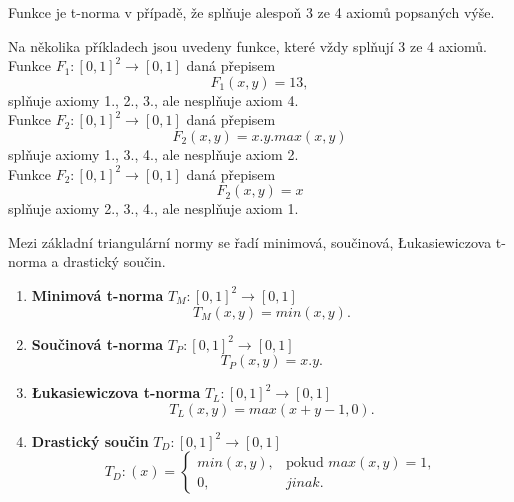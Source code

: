 \begin{remark}
    Funkce je t-norma v případě, že spl\v nuje alespo\v n 3 ze 4 axiom\r u popsaných výše.
\end{remark}

\begin{example} Na několika příkladech jsou uvedeny funkce, které vždy spl\v nují 3 ze 4 axiom\r u.\\
    Funkce $F_1 : [0, 1]^2 \rightarrow [0, 1]$ daná přepisem\\
    $$F_1(x,y) = 13,$$
    spl\v nuje axiomy 1., 2., 3., ale nespl\v nuje axiom 4.\\

    Funkce $F_2 : [0, 1]^2 \rightarrow [0, 1]$ daná přepisem\\
    $$F_2(x,y) = x.y.max(x,y)$$
    spl\v nuje axiomy 1., 3., 4., ale nespl\v nuje axiom 2.\\

    Funkce $F_2 : [0, 1]^2 \rightarrow [0, 1]$ daná přepisem\\
    $$F_2(x,y) = x$$
    spl\v nuje axiomy 2., 3., 4., ale nespl\v nuje axiom 1.\\
    
\end{example}

Mezi základní triangulární normy se řadí minimová, součinová, Łukasiewiczova t-norma a drastický součin.
\begin{example}
\cite{hlinena}
    \begin{enumerate}
    \item \textbf{Minimová t-norma} $T_M: [0,1]^2 \rightarrow [0,1]$
    $$T_M(x,y) = min(x,y).$$
    \item \textbf{Součinová t-norma} $T_P: [0,1]^2 \rightarrow [0,1]$
    $$T_P(x,y) = x.y.$$
    \item \textbf{Łukasiewiczova t-norma} $T_L: [0,1]^2 \rightarrow [0,1]$
    $$T_L(x,y) = max(x+y-1,0).$$
    \item \textbf{Drastický součin} $T_D: [0,1]^2 \rightarrow [0,1]$
    $$T_D:(x)=\begin{cases} min(x,y), & \mbox{pokud }  max(x,y) = 1,\\ 
    0, &  jinak.  \end{cases}$$
\end{enumerate}
\end{example}

